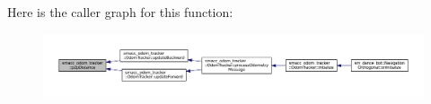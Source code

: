 Here is the caller graph for this function\+:
\nopagebreak
\begin{figure}[H]
\begin{center}
\leavevmode
\includegraphics[width=350pt]{namespacesmacc__odom__tracker_a93496d9bf987249b884e9b0e60778a11_icgraph}
\end{center}
\end{figure}


